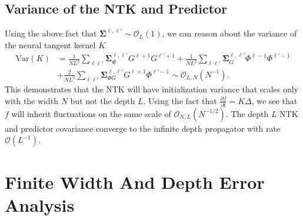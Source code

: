 \documentclass{article} %
\begin{document}
\subsection{Variance of the NTK and Predictor}

Using the above fact that $\bm\Sigma^{\ell,\ell'} \sim \mathcal{O}_L(1)$, we can reason about the variance of the neural tangent kernel $K$ 
\begin{align}
    \text{Var}(K) &= \frac{1}{N L^2} \sum_{\ell \ell'} \bm\Sigma_{\Phi}^{\ell,\ell'} G^{\ell+1} G^{\ell'+1} + \frac{1}{N L^2} \sum_{\ell \ell'} \bm\Sigma_{G}^{\ell,\ell'} \Phi^{\ell-1} \Phi^{\ell'-1} \nonumber
    \\
    &+ \frac{2}{N L^2} \sum_{\ell \ell'} \bm\Sigma_{\Phi G}^{\ell,\ell'} G^{\ell+1} \Phi^{\ell'-1} \sim \mathcal{O}_{L,N}(N^{-1}) .
\end{align}
This demonstrates that the NTK will have initialization variance that scales only with the width $N$ but not the depth $L$. Using the fact that $\frac{\partial f}{\partial t} = K \Delta$, we see that $f$ will inherit fluctuations on the same scale of $\mathcal{O}_{N,L}(N^{-1/2})$. The depth $L$ NTK and predictor covariance converge to the infinite depth propagator with rate $\mathcal{O}(L^{-1})$. 

\section{Finite Width And Depth Error Analysis}\label{app:finite_N_L_error_analysis}
\end{document}
